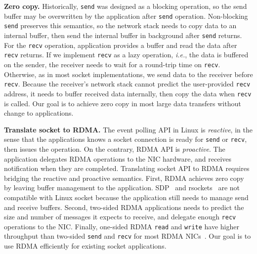 \textbf{Zero copy.}
Historically, \texttt{send} was designed as a blocking operation, so the send buffer may be overwritten by the application after \texttt{send} operation.
Non-blocking \texttt{send} preserves this semantics, so the network stack needs to copy data to an internal buffer, then send the internal buffer in background after \texttt{send} returns.
For the \texttt{recv} operation, application provides a buffer and read the data after \texttt{recv} returns.
If we implement \texttt{recv} as a lazy operation, \textit{i.e.}, the data is buffered on the sender, the receiver needs to wait for a round-trip time on \texttt{recv}.
Otherwise, as in most socket implementations, we send data to the receiver before \texttt{recv}. Because the receiver's network stack cannot predict the user-provided \texttt{recv} address, it needs to buffer received data internally, then copy the data when \texttt{recv} is called.
Our goal is to achieve zero copy in most large data transfers without change to applications.

\textbf{Translate socket to RDMA.}
The event polling API in Linux is \textit{reactive}, in the sense that the applications knows a socket connection is ready for \texttt{send} or \texttt{recv}, then issues the operation.
On the contrary, RDMA API is \textit{proactive}. The application delegates RDMA operations to the NIC hardware, and receives notification when they are completed.
Translating socket API to RDMA requires bridging the reactive and proactive semantics.
First, RDMA achieves zero copy by leaving buffer management to the application. SDP~\cite{socketsdirect} and rsockets~\cite{rsockets} are not compatible with Linux socket because the application still needs to manage send and receive buffers.
Second, two-sided RDMA applications needs to predict the size and number of messages it expects to receive, and delegate enough \texttt{recv} operations to the NIC.
Finally, one-sided RDMA \texttt{read} and \texttt{write} have higher throughput than two-sided \texttt{send} and \texttt{recv} for most RDMA NICs~\cite{kaminsky2016design}.
Our goal is to use RDMA efficiently for existing socket applications.
